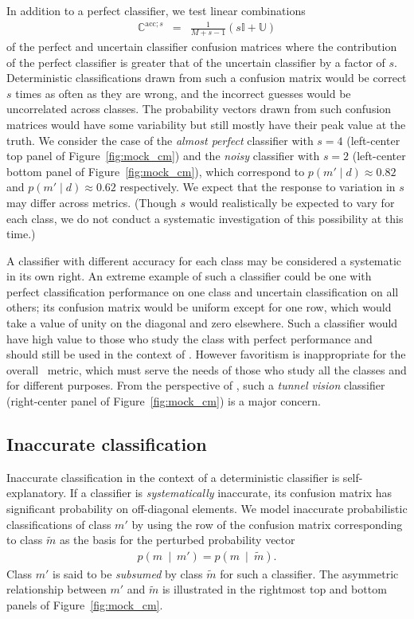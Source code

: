 In addition to a perfect classifier, we test linear combinations
\begin{eqnarray}
  \label{eq:lincomb}
  \mathbb{C}^{\mathrm{acc}; s} &=& \frac{1}{M+s-1} \left(s\mathbb{I} + \mathbb{U}\right)
\end{eqnarray}
of the perfect and uncertain classifier confusion matrices where the contribution of the perfect classifier is greater that of the uncertain classifier by a factor of $s$.
Deterministic classifications drawn from such a confusion matrix would be correct $s$ times as often as they are wrong, and the incorrect guesses would be uncorrelated across classes.
The probability vectors drawn from such confusion matrices would have some variability but still mostly have their peak value at the truth.
We consider the case of the \textit{almost perfect} classifier with $s=4$ (left-center top panel of Figure~\ref{fig:mock_cm}) and the \textit{noisy} classifier with $s=2$ (left-center bottom panel of Figure~\ref{fig:mock_cm}), which correspond to $p(m' \mid d)\approx0.82$ and $p(m' \mid d)\approx0.62$ respectively.
We expect that the response to variation in $s$ may differ across metrics.
(Though $s$ would realistically be expected to vary for each class, we do not conduct a systematic investigation of this possibility at this time.)

A classifier with different accuracy for each class may be considered a systematic in its own right.
An extreme example of such a classifier could be one with perfect classification performance on one class and uncertain classification on all others; its confusion matrix would be uniform except for one row, which would take a value of unity on the diagonal and zero elsewhere.
Such a classifier would have high value to those who study the class with perfect performance and should still be used in the context of \lsst.
However favoritism is inappropriate for the overall \plasticc\ metric, which must serve the needs of those who study all the classes and for different purposes.
From the perspective of \plasticc, such a \textit{tunnel vision} classifier (right-center panel of Figure~\ref{fig:mock_cm}) is a major concern.

\subsection{Inaccurate classification}
\label{sec:inaccuratedata}

Inaccurate classification in the context of a deterministic classifier is self-explanatory.
If a classifier is \textit{systematically} inaccurate, its confusion matrix has significant probability on off-diagonal elements.
We model inaccurate probabilistic classifications of class $m'$ by using the row of the confusion matrix corresponding to class $\tilde{m}$ as the basis for the perturbed probability vector
\begin{eqnarray}
  \label{eq:subsume}
  p(m\ \mid\ m') = p(m\ \mid\ \tilde{m}).
\end{eqnarray}
Class $m'$ is said to be \textit{subsumed} by class $\tilde{m}$ for such a classifier.
The asymmetric relationship between $m'$ and $\tilde{m}$ is illustrated in the rightmost top and bottom panels of Figure~\ref{fig:mock_cm}.

